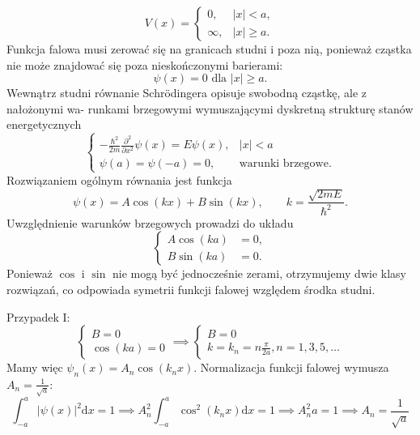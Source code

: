 \begin{equation*}
	V(x) = \begin{cases}
		0, &|x|<a,\\
		\infty, &|x|\geq a.
	\end{cases}
\end{equation*}
Funkcja falowa musi zerować się na granicach studni i poza nią, ponieważ cząstka nie może znajdować się poza nieskończonymi barierami:
\begin{equation*}
	\psi(x) = 0 \text{ dla } |x| \geq a.
\end{equation*}
Wewnątrz studni równanie Schrödingera opisuje swobodną cząstkę, ale z nałożonymi wa-
runkami brzegowymi wymuszającymi dyskretną strukturę stanów energetycznych
\begin{equation*}
	\begin{cases}
		-\frac{\hbar^2}{2m}\frac{\partial^2}{\partial x^2}\psi(x) = E\psi(x), &|x|<a\\
		\psi(a) = \psi(-a) = 0, & \text{warunki brzegowe.}
	\end{cases}
\end{equation*}
Rozwiązaniem ogólnym równania jest funkcja
\begin{equation*}
	\psi(x) = A\cos(kx) + B\sin(kx), \qquad k = \frac{\sqrt{2mE}}{\hbar^2}.
\end{equation*}
Uwzględnienie warunków brzegowych prowadzi do układu
\begin{equation*}
	\begin{cases}
		A\cos(ka) &= 0,\\
		B\sin(ka) &= 0.
	\end{cases}
\end{equation*}
Ponieważ $\cos$ i $\sin$ nie mogą być jednocześnie zerami, otrzymujemy dwie klasy rozwiązań, co odpowiada symetrii funkcji falowej względem środka studni.

Przypadek I:
\begin{equation*}
	\begin{cases}
		B = 0\\
		\cos(ka) = 0
	\end{cases}
	 \implies
	\begin{cases}
		B = 0\\
		k = k_n = n \frac{\pi}{2a}, n = 1, 3, 5, \dots
	\end{cases}
\end{equation*}
Mamy więc $\psi_n(x) = A_n \cos(k_n x)$. Normalizacja funkcji falowej wymusza $A_n = \frac{1}{\sqrt{a}}$:
\begin{equation*}
	\int_{-a}^{a} |\psi(x)|^2 \mathrm{d}x = 1 \implies A_n^2 \int_{-a}^{a} \cos^2(k_nx) \mathrm{d}x = 1 \implies A_n^2 a = 1 \implies A_n = \frac{1}{\sqrt{a}}
\end{equation*}

